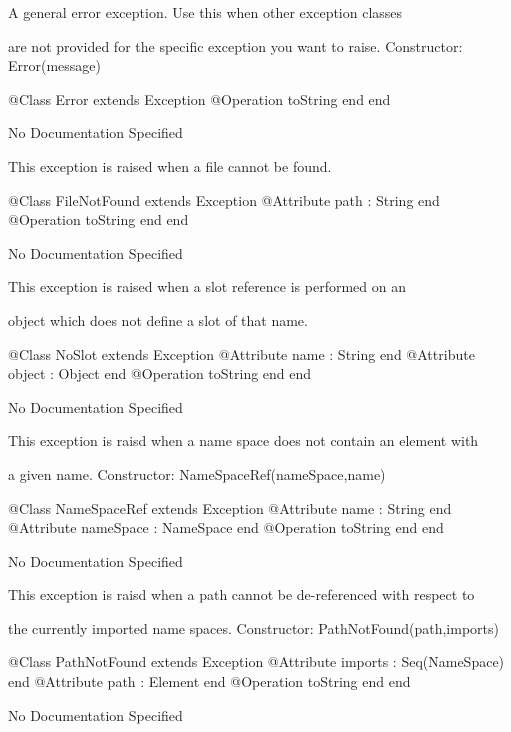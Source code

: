       A general error exception. Use this when other exception classes

      are not provided for the specific exception you want to raise.
      Constructor: Error(message)
\begin{Interface}
@Class Error extends Exception
  @Operation toString end
end
\end{Interface}
No Documentation Specified

      This exception is raised when a file cannot be found.
\begin{Interface}
@Class FileNotFound extends Exception
  @Attribute path : String end
  @Operation toString end
end
\end{Interface}
No Documentation Specified

      This exception is raised when a slot reference is performed on an

      object which does not define a slot of that name.
\begin{Interface}
@Class NoSlot extends Exception
  @Attribute name : String end
  @Attribute object : Object end
  @Operation toString end
end
\end{Interface}
No Documentation Specified

      This exception is raisd when a name space does not contain an element with

      a given name.
      Constructor: NameSpaceRef(nameSpace,name)
\begin{Interface}
@Class NameSpaceRef extends Exception
  @Attribute name : String end
  @Attribute nameSpace : NameSpace end
  @Operation toString end
end
\end{Interface}
No Documentation Specified

      This exception is raisd when a path cannot be de-referenced with respect to

      the currently imported name spaces.
      Constructor: PathNotFound(path,imports)
\begin{Interface}
@Class PathNotFound extends Exception
  @Attribute imports : Seq(NameSpace) end
  @Attribute path : Element end
  @Operation toString end
end
\end{Interface}
No Documentation Specified

